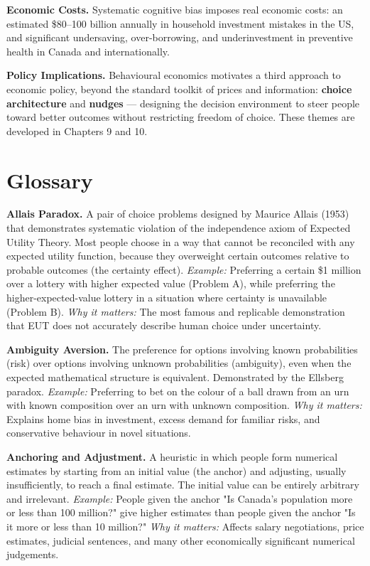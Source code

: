 \documentclass[12pt, letterpaper]{article}
\begin{document}
\textbf{Economic Costs.} Systematic cognitive bias imposes real economic costs: an estimated \$80--100 billion annually in household investment mistakes in the US, and significant undersaving, over-borrowing, and underinvestment in preventive health in Canada and internationally.

\textbf{Policy Implications.} Behavioural economics motivates a third approach to economic policy, beyond the standard toolkit of prices and information: \textbf{choice architecture} and \textbf{nudges} --- designing the decision environment to steer people toward better outcomes without restricting freedom of choice. These themes are developed in Chapters 9 and 10.

\newpage


\section*{Glossary}


\textbf{Allais Paradox.} A pair of choice problems designed by Maurice Allais (1953) that demonstrates systematic violation of the independence axiom of Expected Utility Theory. Most people choose in a way that cannot be reconciled with any expected utility function, because they overweight certain outcomes relative to probable outcomes (the certainty effect). \textit{Example:} Preferring a certain \$1 million over a lottery with higher expected value (Problem A), while preferring the higher-expected-value lottery in a situation where certainty is unavailable (Problem B). \textit{Why it matters:} The most famous and replicable demonstration that EUT does not accurately describe human choice under uncertainty.

\textbf{Ambiguity Aversion.} The preference for options involving known probabilities (risk) over options involving unknown probabilities (ambiguity), even when the expected mathematical structure is equivalent. Demonstrated by the Ellsberg paradox. \textit{Example:} Preferring to bet on the colour of a ball drawn from an urn with known composition over an urn with unknown composition. \textit{Why it matters:} Explains home bias in investment, excess demand for familiar risks, and conservative behaviour in novel situations.

\textbf{Anchoring and Adjustment.} A heuristic in which people form numerical estimates by starting from an initial value (the anchor) and adjusting, usually insufficiently, to reach a final estimate. The initial value can be entirely arbitrary and irrelevant. \textit{Example:} People given the anchor "Is Canada's population more or less than 100 million?" give higher estimates than people given the anchor "Is it more or less than 10 million?" \textit{Why it matters:} Affects salary negotiations, price estimates, judicial sentences, and many other economically significant numerical judgements.
\end{document}
